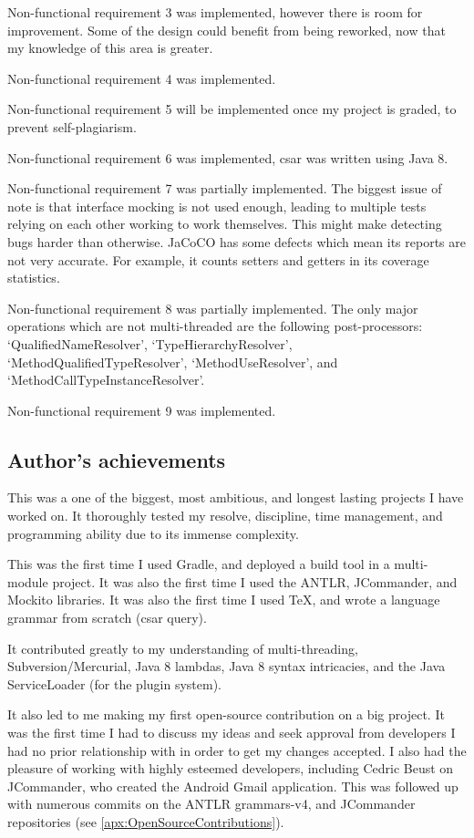 \documentclass[12pt, letterpaper]{article}
\begin{document}
Non-functional requirement 3 was implemented, however there is room for improvement.
Some of the design could benefit from being reworked, now that my knowledge of this area is greater.

Non-functional requirement 4 was implemented.

Non-functional requirement 5 will be implemented once my project is graded, to prevent self-plagiarism.

Non-functional requirement 6 was implemented, csar was written using Java 8.

Non-functional requirement 7 was partially implemented.
The biggest issue of note is that interface mocking is not used enough, leading to multiple tests relying on each other working to work themselves.
This might make detecting bugs harder than otherwise.
JaCoCO has some defects which mean its reports are not very accurate.
For example, it counts setters and getters in its coverage statistics.

Non-functional requirement 8 was partially implemented.
The only major operations which are not multi-threaded are the following post-processors: `QualifiedNameResolver', `TypeHierarchyResolver', `MethodQualifiedTypeResolver', `MethodUseResolver', and `MethodCallTypeInstanceResolver'.

Non-functional requirement 9 was implemented.

\subsection{Author's achievements}
This was a one of the biggest, most ambitious, and longest lasting projects I have worked on.
It thoroughly tested my resolve, discipline, time management, and programming ability due to its immense complexity.

This was the first time I used Gradle, and deployed a build tool in a multi-module project.
It was also the first time I used the ANTLR, JCommander, and Mockito libraries.
It was also the first time I used TeX, and wrote a language grammar from scratch (csar query).

It contributed greatly to my understanding of multi-threading, Subversion/Mercurial, Java 8 lambdas, Java 8 syntax intricacies, and the Java ServiceLoader (for the plugin system).

It also led to me making my first open-source contribution on a big project.
It was the first time I had to discuss my ideas and seek approval from developers I had no prior relationship with in order to get my changes accepted.
I also had the pleasure of working with highly esteemed developers, including Cedric Beust on JCommander, who created the Android Gmail application.
This was followed up with numerous commits on the ANTLR grammars-v4, and JCommander repositories (see \ref{apx:OpenSourceContributions}).
\end{document}
